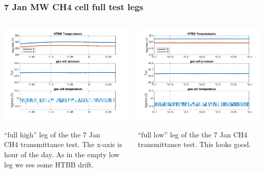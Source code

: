 \documentclass[10pt]{beamer}
\begin{document}
\begin{frame}
\frametitle{7 Jan MW CH4 cell full test legs}
\begin{columns}[t]
\begin{column}{0.5\textwidth}
  \begin{centering}
  \includegraphics[width=\textwidth]{figures/MW_high_full_gas_unknown.png}
  \end{centering}\vspace{3mm}

 ``full high'' leg of the the 7 Jan \\ CH4 transmittance test.  The
  x-axis is hour of the day.  As in the empty low leg we see some
  HTBB drift.

\end{column}
\begin{column}{0.5\textwidth}  
  \begin{centering}
  \includegraphics[width=\textwidth]{figures/MW_low_full_gas_unknown.png}
  \end{centering}\vspace{3mm}

 ``full low'' leg of the the 7 Jan CH4 transmittance test.  This
  looks good.

\end{column}
\end{columns}
\end{frame}
\end{document}
